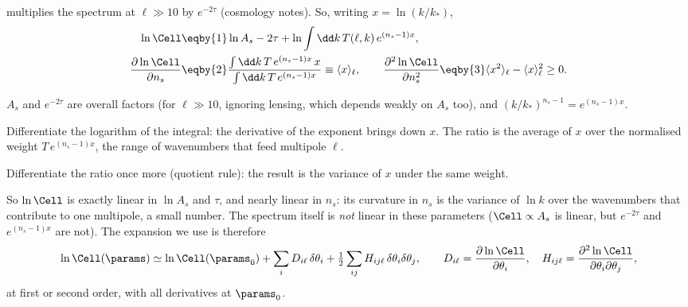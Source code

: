 multiplies the spectrum at $\ell\gg10$ by $e^{-2\tau}$ (cosmology notes). So, writing $x=\ln(k/k_*)$,
\begin{align}
  \ln\Cell
  &\eqby{1}\ln A_s-2\tau+\ln\int\dd k\,T(\ell,k)\,e^{(n_s-1)x},
  \nonumber\\
  \frac{\partial\ln\Cell}{\partial n_s}
  &\eqby{2}\frac{\int\dd k\,T\,e^{(n_s-1)x}\,x}{\int\dd k\,T\,e^{(n_s-1)x}}\equiv\langle x\rangle_\ell,
  \qquad
  \frac{\partial^2\ln\Cell}{\partial n_s^2}\eqby{3}\langle x^2\rangle_\ell-\langle x\rangle_\ell^2\ge0 .
  \label{9c:eq:dlnC}
\end{align}
\begin{explain}
  \item $A_s$ and $e^{-2\tau}$ are overall factors (for $\ell\gg10$, ignoring lensing, which depends weakly
        on $A_s$ too), and $(k/k_*)^{n_s-1}=e^{(n_s-1)x}$.
  \item Differentiate the logarithm of the integral: the derivative of the exponent brings down $x$. The
        ratio is the average of $x$ over the normalised weight $T\,e^{(n_s-1)x}$, the range of
        wavenumbers that feed multipole $\ell$.
  \item Differentiate the ratio once more (quotient rule): the result is the variance of $x$ under the
        same weight.
\end{explain}
So $\ln\Cell$ is exactly linear in $\ln A_s$ and $\tau$, and nearly linear in $n_s$: its curvature in $n_s$
is the variance of $\ln k$ over the wavenumbers that contribute to one multipole, a small number. The
spectrum itself is \emph{not} linear in these parameters ($\Cell\propto A_s$ is linear, but $e^{-2\tau}$ and
$e^{(n_s-1)x}$ are not). The expansion we use is therefore
\begin{equation}
  \ln\Cell(\params)\simeq\ln\Cell(\params_0)+\sum_iD_{i\ell}\,\delta\theta_i
  +\tfrac12\sum_{ij}H_{ij\ell}\,\delta\theta_i\delta\theta_j,
  \qquad D_{i\ell}=\frac{\partial\ln\Cell}{\partial\theta_i},\quad H_{ij\ell}=\frac{\partial^2\ln\Cell}{\partial\theta_i\partial\theta_j},
  \label{9c:eq:emu}
\end{equation}
at first or second order, with all derivatives at $\params_0$.

